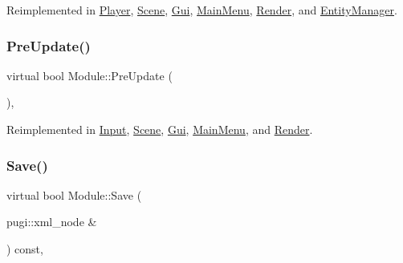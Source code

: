 Reimplemented in \mbox{\hyperlink{class_player_a1defee0e5f5a011305ae00d3a022af18}{Player}}, \mbox{\hyperlink{class_scene_a0e0ffba2fc23c7cb61242e99e59e4c68}{Scene}}, \mbox{\hyperlink{class_gui_a49d5bf6fa118544dd5827f0412d5968d}{Gui}}, \mbox{\hyperlink{class_main_menu_a39f02a2a3397937781de079abba13a5a}{Main\+Menu}}, \mbox{\hyperlink{class_render_a87fd5693f0ece06ba67ab57534b65dc6}{Render}}, and \mbox{\hyperlink{class_entity_manager_a1ad9ecfb4c966a1b399146d5a9209425}{Entity\+Manager}}.

\mbox{\label{class_module_a2c64af5917825500cf6f0497258bc398}} 
\subsubsection{\texorpdfstring{PreUpdate()}{PreUpdate()}}
{\footnotesize\ttfamily virtual bool Module\+::\+Pre\+Update (\begin{DoxyParamCaption}{ }\end{DoxyParamCaption})\hspace{0.3cm}{\ttfamily [inline]}, {\ttfamily [virtual]}}



Reimplemented in \mbox{\hyperlink{class_input_a850eff60334f4057e5cb579892d7cf06}{Input}}, \mbox{\hyperlink{class_scene_aec633b956df0e05760f2274b5816d321}{Scene}}, \mbox{\hyperlink{class_gui_a0909298219825317830f462bec002d5b}{Gui}}, \mbox{\hyperlink{class_main_menu_aba12dda658020b2394ec3449c92ae16e}{Main\+Menu}}, and \mbox{\hyperlink{class_render_a96d1311a9bc190d2a1dd669bb3c56ab4}{Render}}.

\mbox{\label{class_module_aae4bfdba7949d0f94bd8073b3a27dc3d}} 
\subsubsection{\texorpdfstring{Save()}{Save()}}
{\footnotesize\ttfamily virtual bool Module\+::\+Save (\begin{DoxyParamCaption}\item[{pugi\+::xml\+\_\+node \&}]{ }\end{DoxyParamCaption}) const\hspace{0.3cm}{\ttfamily [inline]}, {\ttfamily [virtual]}}



